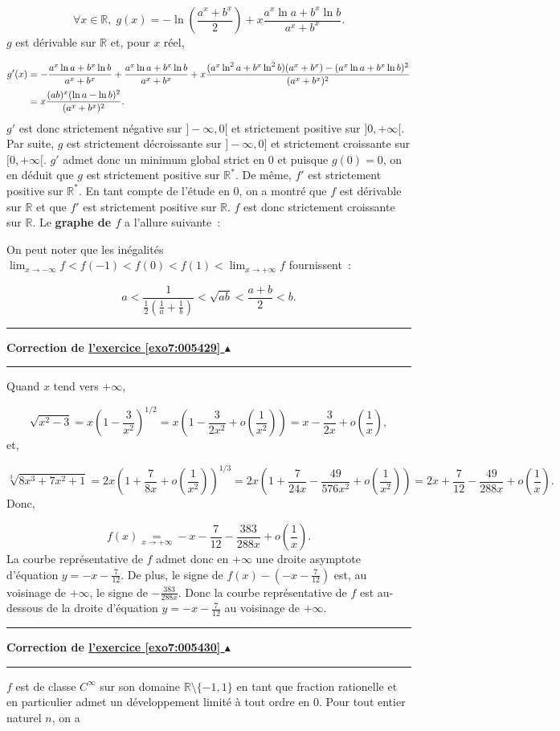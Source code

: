 \documentclass[11pt,a4paper]{article}
\newcommand{\Rr}{\mathbb{R}} \newcommand{\R}{\mathbb{R}}
\newcounter{exo}
\newcommand{\correction}[1]{\hypertarget{cor7:#1}{}\label{cor7:#1}{\bf Correction de \hyperlink{exo7:#1}{l'exercice \ref{exo7:#1} $\blacktriangle$}}\vspace{1mm}\hrule\vspace{1mm}}
\newcommand{\fincorrection}{\vspace{1mm}\hrule\vspace*{7mm}}
\begin{document}
$$\forall x\in\Rr,\;g(x)=-\ln\left(\frac{a^x+b^x}{2}\right)+x\frac{a^x\ln a+b^x\ln b}{a^x+b^x}.$$
$g$ est dérivable sur $\Rr$ et, pour $x$ réel,

\begin{align*}\ensuremath
g'(x)&=-\frac{a^x\ln a+b^x\ln b}{a^x+b^x}+\frac{a^x\ln a+b^x\ln b}{a^x+b^x}+x\frac{(a^x\ln^2a+b^x\ln^2b)(a^x+b^x)-(a^x\ln a+b^x\ln b)^2}{(a^x+b^x)^2}\\
 &=x\frac{(ab)^x(\ln a-\ln b)^2}{(a^x+b^x)^2}.
\end{align*}
$g'$ est donc strictement négative sur $]-\infty,0[$ et strictement positive sur $]0,+\infty[$. Par suite, $g$ est strictement décroissante sur $]-\infty,0]$ et strictement croissante sur $[0,+\infty[$. $g'$ admet donc un minimum global strict en $0$ et puisque $g(0)=0$, on en déduit que $g$ est strictement positive sur $\Rr^*$. De même, $f'$ est strictement positive sur $\Rr^*$. En tant compte de l'étude en $0$, on a montré que $f$ est dérivable sur $\Rr$ et que $f'$ est strictement positive sur $\Rr$. $f$ est donc strictement croissante sur $\Rr$.
Le \textbf{graphe de $f$} a l'allure suivante~:


On peut noter que les inégalités $\lim_{x\rightarrow -\infty}f<f(-1)<f(0)<f(1)<\lim_{x\rightarrow +\infty}f$ fournissent~:

$$a<\frac{1}{\frac{1}{2}(\frac{1}{a}+\frac{1}{b})}<\sqrt{ab}<\frac{a+b}{2}<b.$$
\fincorrection
\correction{005429}
Quand $x$ tend vers $+\infty$,

$$\sqrt{x^2-3}=x\left(1-\frac{3}{x^2}\right)^{1/2}=x\left(1-\frac{3}{2x^2}+o(\frac{1}{x^2})\right)=x-\frac{3}{2x}+o\left(\frac{1}{x}\right),$$
et,

$$\sqrt[3]{8x^3+7x^2+1}=2x\left(1+\frac{7}{8x}+o\left(\frac{1}{x^2}\right)\right)^{1/3}=2x\left(1+\frac{7}{24x}-\frac{49}{576x^2}+o\left(\frac{1}{x^2}\right)\right)=2x+\frac{7}{12}-\frac{49}{288x}+o\left(\frac{1}{x}\right).$$
Donc,

$$f(x)\underset{x\rightarrow+\infty}{=}-x-\frac{7}{12}-\frac{383}{288x}+o\left(\frac{1}{x}\right).$$
La courbe représentative de $f$ admet donc en $+\infty$ une droite asymptote d'équation $y=-x-\frac{7}{12}$. De plus, le signe de $f(x)-\left(-x-\frac{7}{12}\right)$ est, au voisinage de $+\infty$, le signe de $-\frac{383}{288x}$. Donc la courbe représentative de $f$ est au-dessous de la droite d'équation $y=-x-\frac{7}{12}$ au voisinage de $+\infty$.
\fincorrection
\correction{005430}
$f$ est de classe $C^\infty$ sur son domaine $\Rr\setminus\{-1,1\}$ en tant que fraction rationelle et en particulier admet un développement limité à tout ordre en $0$. Pour tout entier naturel $n$, on a
\end{document}
